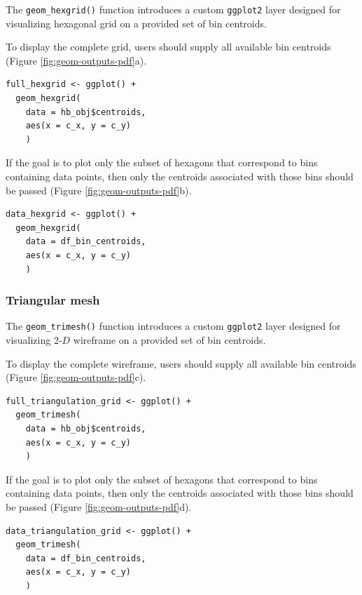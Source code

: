 The \texttt{geom\_hexgrid()} function introduces a custom \texttt{ggplot2} layer designed for visualizing hexagonal grid on a provided set of bin centroids.

To display the complete grid, users should supply all available bin centroids (Figure \ref{fig:geom-outputs-pdf}a).

\begin{verbatim}
full_hexgrid <- ggplot() + 
  geom_hexgrid(
    data = hb_obj$centroids, 
    aes(x = c_x, y = c_y)
    ) 
\end{verbatim}

If the goal is to plot only the subset of hexagons that correspond to bins containing data points, then only the centroids associated with those bins should be passed (Figure \ref{fig:geom-outputs-pdf}b).

\begin{verbatim}
data_hexgrid <- ggplot() + 
  geom_hexgrid(
    data = df_bin_centroids, 
    aes(x = c_x, y = c_y)
    ) 
\end{verbatim}

\subsubsection{Triangular mesh}\label{triangular-mesh}

The \texttt{geom\_trimesh()} function introduces a custom \texttt{ggplot2} layer designed for visualizing \(2\text{-}D\) wireframe on a provided set of bin centroids.

To display the complete wireframe, users should supply all available bin centroids (Figure \ref{fig:geom-outputs-pdf}c).

\begin{verbatim}
full_triangulation_grid <- ggplot() + 
  geom_trimesh(
    data = hb_obj$centroids, 
    aes(x = c_x, y = c_y)
    ) 
\end{verbatim}

If the goal is to plot only the subset of hexagons that correspond to bins containing data points, then only the centroids associated with those bins should be passed (Figure \ref{fig:geom-outputs-pdf}d).

\begin{verbatim}
data_triangulation_grid <- ggplot() + 
  geom_trimesh(
    data = df_bin_centroids, 
    aes(x = c_x, y = c_y)
    ) 
\end{verbatim}

